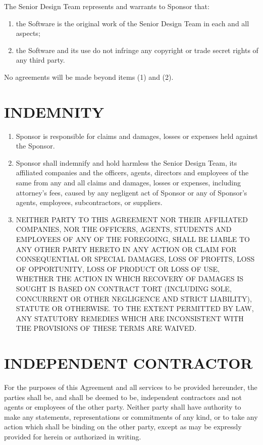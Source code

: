 \documentclass[11pt]{article}
\begin{document}
The Senior Design Team represents and warrants to Sponsor that:   
\begin{enumerate}  \itemsep4pt \parskip0pt 
\item  the Software is the original work of the Senior Design Team in each and all aspects;  

\item the Software and its use do not infringe any copyright or   trade secret rights of any third party.  
\end{enumerate}
No agreements will be made beyond items (1) and (2).

\section{INDEMNITY}   
\begin{enumerate}  \itemsep4pt \parskip0pt 
\item Sponsor is responsible for claims and damages, losses or expenses held against the Sponsor.

\item  Sponsor shall indemnify and hold harmless the Senior Design Team, its affiliated companies and the officers, agents, directors and employees of the same from any and all claims and damages, losses or expenses, including attorney's fees, caused by any negligent act of Sponsor or any of Sponsor's agents, employees, subcontractors, or suppliers.    

\item  NEITHER PARTY TO THIS AGREEMENT NOR THEIR AFFILIATED COMPANIES, NOR THE OFFICERS, AGENTS, STUDENTS AND EMPLOYEES OF ANY OF THE FOREGOING, SHALL BE LIABLE TO ANY OTHER PARTY HERETO IN ANY ACTION OR CLAIM FOR CONSEQUENTIAL OR SPECIAL DAMAGES, LOSS OF PROFITS, LOSS OF OPPORTUNITY, LOSS OF PRODUCT OR LOSS OF USE, WHETHER THE ACTION IN WHICH RECOVERY OF DAMAGES IS SOUGHT IS BASED ON CONTRACT TORT (INCLUDING SOLE, CONCURRENT OR OTHER NEGLIGENCE AND STRICT LIABILITY), STATUTE OR OTHERWISE. TO THE EXTENT PERMITTED BY LAW, ANY STATUTORY REMEDIES WHICH ARE INCONSISTENT WITH THE PROVISIONS OF THESE TERMS ARE WAIVED.  
\end{enumerate}

\section{INDEPENDENT CONTRACTOR}  

For the purposes of this Agreement and all services to be provided hereunder, the parties shall be, and shall be deemed to be, independent contractors and not agents or employees of the other party. Neither party shall have authority to make any statements, representations or commitments of any kind, or to take any action which shall be binding on the other party, except as may be expressly provided for herein or authorized in writing.  
\end{document}
